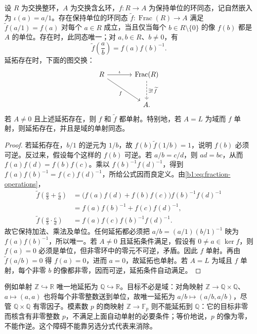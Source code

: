 \begin{theorem}\label{b1:thm:fraction-field-universal}
	设 \(R\) 为交换整环，\(A\) 为交换含幺环，\(f:R\rightarrow A\) 为保持单位的环同态，记自然嵌入为 \(\iota(a)=a/1\)。存在保持单位的环同态 \(\widetilde f:\operatorname{Frac}(R)\rightarrow A\) 满足 \(\widetilde f(a/1)=f(a)\) 对每个 \(a\in R\) 成立，当且仅当每个 \(b\in R\setminus\{0\}\) 的像 \(f(b)\) 都是 \(A\) 的单位。存在时，此同态唯一；对 \(a,b\in R\)、\(b\ne0\)，有
	\[
		\widetilde f\left(\frac ab\right)=f(a)f(b)^{-1}.
	\]
	延拓存在时，下面的图交换：
	\[
		\begin{tikzcd}[column sep=large,row sep=large]
			R\arrow[r,"\iota"]\arrow[dr,"f"'] &\operatorname{Frac}(R)\arrow[d,dashed,"\exists!\,\widetilde f"]\\
			&A.
		\end{tikzcd}
	\]
	若 \(A\ne0\) 且上述延拓存在，则 \(f\) 和 \(\widetilde f\) 都单射。特别地，若 \(A=L\) 为域而 \(f\) 单射，则延拓存在，并且是域的单射同态。
\end{theorem}
\begin{proof}
	若延拓存在，\(b/1\) 的逆元为 \(1/b\)，故 \(f(b)\widetilde f(1/b)=1\)，说明 \(f(b)\) 必须可逆。反过来，假设每个这样的 \(f(b)\) 可逆。若 \(a/b=c/d\)，则 \(ad=bc\)，从而 \(f(a)f(d)=f(b)f(c)\)。乘以 \(f(b)^{-1}f(d)^{-1}\)，得到 \(f(a)f(b)^{-1}=f(c)f(d)^{-1}\)，所给公式因而良定义。由\eqref{b1:eq:fraction-operations}，
	\[
		\begin{aligned}
			\widetilde f\left(\frac ab+\frac cd\right) &=\bigl(f(a)f(d)+f(b)f(c)\bigr)f(b)^{-1}f(d)^{-1}\\
			&=f(a)f(b)^{-1}+f(c)f(d)^{-1},\\
			\widetilde f\left(\frac ab\cdot\frac cd\right) &=f(a)f(c)f(b)^{-1}f(d)^{-1}.
		\end{aligned}
	\]
	故它保持加法、乘法及单位。任何延拓都必须把 \(a/b=(a/1)(b/1)^{-1}\) 映为 \(f(a)f(b)^{-1}\)，所以唯一。若 \(A\ne0\) 且延拓条件满足，假设有 \(0\ne a\in\ker f\)，则 \(f(a)=0\) 必须是单位，但非零环中的零元不可逆，矛盾。因此 \(f\) 单射。再由 \(\widetilde f(a/b)=0\) 得 \(f(a)=0\)，进而 \(a=0\)，故延拓也单射。若 \(A=L\) 为域且 \(f\) 单射，每个非零 \(b\) 的像都非零，因而可逆，延拓条件自动满足。
\end{proof}

例如单射 \(\mathbb Z\hookrightarrow\mathbb R\) 唯一地延拓为 \(\mathbb Q\hookrightarrow\mathbb R\)。目标不必是域：对角映射 \(\mathbb Z\rightarrow\mathbb Q\times\mathbb Q\)、\(a\mapsto(a,a)\) 也将每个非零整数送到单位，故唯一延拓为 \(a/b\mapsto(a/b,a/b)\)，尽管 \(\mathbb Q\times\mathbb Q\) 有零因子。模素数 \(p\) 的商映射 \(\mathbb Z\rightarrow\mathbb F_p\) 则不能延拓到 \(\mathbb Q\)：它的目标非零而核含有非零整数 \(p\)，不满足上面自动单射的必要条件；等价地说，\(p\) 的像为零，不能作逆。这个障碍不能靠另选分式代表来消除。

